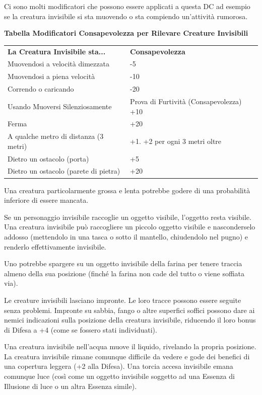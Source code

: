 \documentclass[a4paper,11pt,twoside,openany]{book}
\begin{document}
Ci sono molti modificatori che possono essere applicati a questa DC ad esempio se la creatura invisibile si sta muovendo o sta compiendo un'attività rumorosa.

\bigskip

\textbf{Tabella Modificatori Consapevolezza per Rilevare Creature Invisibili}

\medskip

\begin{tabular}{ll}
	\toprule
	\textbf{La Creatura Invisibile sta...} & \textbf{Consapevolezza}\\
	Muovendosi a velocità dimezzata        & -5\\
	Muovendosi a piena velocità            & -10\\
	Correndo o caricando                   & -20\\
	Usando Muoversi Silenziosamente        & Prova di Furtività (Consapevolezza) +10\\
	Ferma                                  & +20\\
	A qualche metro di distanza (3 metri)  & +1. +2 per ogni 3 metri oltre\\
	Dietro un ostacolo (porta)             & +5\\
	Dietro un ostacolo (parete di pietra)  & +20\\
\end{tabular}

\bigskip

Una creatura particolarmente grossa e lenta potrebbe godere di una probabilità inferiore di essere mancata.

Se un personaggio invisibile raccoglie un oggetto visibile, l'oggetto resta visibile. Una creatura invisibile può raccogliere un piccolo oggetto visibile e nasconderselo addosso (mettendolo in una tasca o sotto il mantello, chiudendolo nel pugno) e renderlo effettivamente invisibile.

Uno potrebbe spargere su un oggetto invisibile della farina per tenere traccia almeno della sua posizione (finché la farina non cade del tutto o viene soffiata via).

Le creature invisibili lasciano impronte. Le loro tracce possono essere seguite senza problemi. Impronte su sabbia, fango o altre superfici soffici possono dare ai nemici indicazioni sulla posizione della creatura invisibile, riducendo il loro bonus di Difesa a +4 (come se fossero stati individuati).

Una creatura invisibile nell'acqua muove il liquido, rivelando la propria posizione. La creatura invisibile rimane comunque difficile da vedere e gode dei benefici di una copertura leggera (+2 alla Difesa).
Una torcia accesa invisibile emana comunque luce (così come un oggetto invisibile soggetto ad una Essenza di Illusione di luce o un altra Essenza simile).
\end{document}
